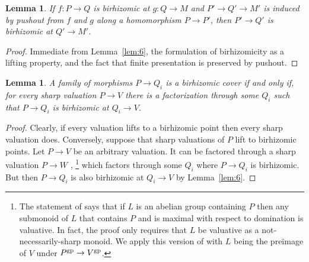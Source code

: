 \documentclass[10pt]{article}
\numberwithin{equation}{section}
\newtheorem{lemma}[paragraph]{Lemma}
\theoremstyle{definition}
\theoremstyle{remark}
\newcommand{\gp}[1]{#1^{\rm gp}}
\begin{document}
\begin{lemma} \label{lem:10}
	If $f : P \to Q$ is birhizomic at $g : Q \to M$ and $P' \to Q' \to M'$ is induced by pushout from $f$ and $g$ along a homomorphism $P \to P'$, then $P' \to Q'$ is birhizomic at $Q' \to M'$.
\end{lemma}
\begin{proof}
	Immediate from Lemma~\ref{lem:6}, the formulation of birhizomicity as a lifting property, and the fact that finite presentation is preserved by pushout.
\end{proof}





\begin{lemma} \label{lem:1}
	A family of morphisms $P \to Q_i$ is a birhizomic cover if and only if, for every \emph{sharp} valuation $P \to V$ there is a factorization through some $Q_i$ such that $P \to Q_i$ is birhizomic at $Q_i \to V$.
\end{lemma}
\begin{proof}
	Clearly, if every valuation lifts to a birhizomic point then every sharp valuation does.  Conversely, suppose that sharp valuations of $P$ lift to birhizomic points.  Let $P \to V$ be an arbitrary valuation.  It can be factored through a sharp valuation $P \to W$ \cite[Proposition~I.2.4.1]{ogusloggeom},%
	\footnote{The statement of \cite[Proposition~I.2.4.1]{ogusloggeom} says that if $L$ is an abelian group containing $P$ then any submonoid of $L$ that contains $P$ and is maximal with respect to domination is valuative.  In fact, the proof only requires that $L$ be valuative as a not-necessarily-sharp monoid.  We apply this version of \cite[Proposition~I.2.4.1]{ogusloggeom} with $L$ being the pre\"image of $V$ under $\gp P \to \gp V$.}\label{foot:1}
	which factors through some $Q_i$ where $P \to Q_i$ is birhizomic.  But then $P \to Q_i$ is also birhizomic at $Q_i \to V$ by Lemma~\ref{lem:6}.
\end{proof}
\end{document}
